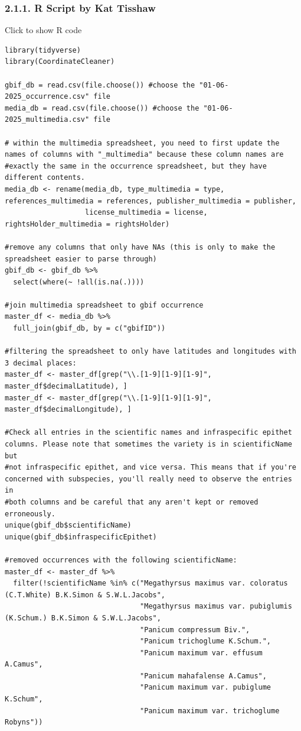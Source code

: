 \documentclass[
]{article}
\begin{document}
\subsubsection{2.1.1. R Script by Kat
Tisshaw}\label{r-script-by-kat-tisshaw}

Click to show R code

\begin{verbatim}
library(tidyverse)
library(CoordinateCleaner)

gbif_db = read.csv(file.choose()) #choose the "01-06-2025_occurrence.csv" file
media_db = read.csv(file.choose()) #choose the "01-06-2025_multimedia.csv" file

# within the multimedia spreadsheet, you need to first update the names of columns with "_multimedia" because these column names are
#exactly the same in the occurrence spreadsheet, but they have different contents.
media_db <- rename(media_db, type_multimedia = type, references_multimedia = references, publisher_multimedia = publisher,
                   license_multimedia = license, rightsHolder_multimedia = rightsHolder)

#remove any columns that only have NAs (this is only to make the spreadsheet easier to parse through)
gbif_db <- gbif_db %>%
  select(where(~ !all(is.na(.))))

#join multimedia spreadsheet to gbif occurrence
master_df <- media_db %>%
  full_join(gbif_db, by = c("gbifID"))

#filtering the spreadsheet to only have latitudes and longitudes with 3 decimal places:
master_df <- master_df[grep("\\.[1-9][1-9][1-9]", master_df$decimalLatitude), ]
master_df <- master_df[grep("\\.[1-9][1-9][1-9]", master_df$decimalLongitude), ]

#Check all entries in the scientific names and infraspecific epithet columns. Please note that sometimes the variety is in scientificName but
#not infraspecific epithet, and vice versa. This means that if you're concerned with subspecies, you'll really need to observe the entries in
#both columns and be careful that any aren't kept or removed erroneously.
unique(gbif_db$scientificName)
unique(gbif_db$infraspecificEpithet)

#removed occurrences with the following scientificName:
master_df <- master_df %>%
  filter(!scientificName %in% c("Megathyrsus maximus var. coloratus (C.T.White) B.K.Simon & S.W.L.Jacobs",
                                "Megathyrsus maximus var. pubiglumis (K.Schum.) B.K.Simon & S.W.L.Jacobs",
                                "Panicum compressum Biv.",
                                "Panicum trichoglume K.Schum.",
                                "Panicum maximum var. effusum A.Camus",
                                "Panicum mahafalense A.Camus",
                                "Panicum maximum var. pubiglume K.Schum",
                                "Panicum maximum var. trichoglume Robyns"))


\end{verbatim}
\end{document}
